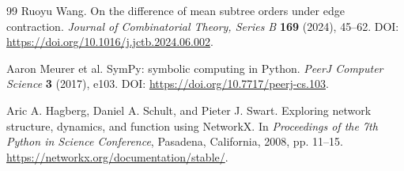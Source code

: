 \documentclass[11pt,letterpaper]{article}
\theoremstyle{plain}
\begin{document}
\begin{thebibliography}{99}
Ruoyu Wang. On the difference of mean subtree orders under edge contraction. \emph{Journal of Combinatorial Theory, Series B} \textbf{169} (2024), 45--62.
\newblock DOI: \url{https://doi.org/10.1016/j.jctb.2024.06.002}.

Aaron Meurer et al. SymPy: symbolic computing in Python. \emph{PeerJ Computer Science} \textbf{3} (2017), e103.
\newblock DOI: \url{https://doi.org/10.7717/peerj-cs.103}.

Aric A. Hagberg, Daniel A. Schult, and Pieter J. Swart. Exploring network structure, dynamics, and function using NetworkX. In \emph{Proceedings of the 7th Python in Science Conference}, Pasadena, California, 2008, pp. 11--15.
\newblock \url{https://networkx.org/documentation/stable/}.

\end{thebibliography}

\end{document}
